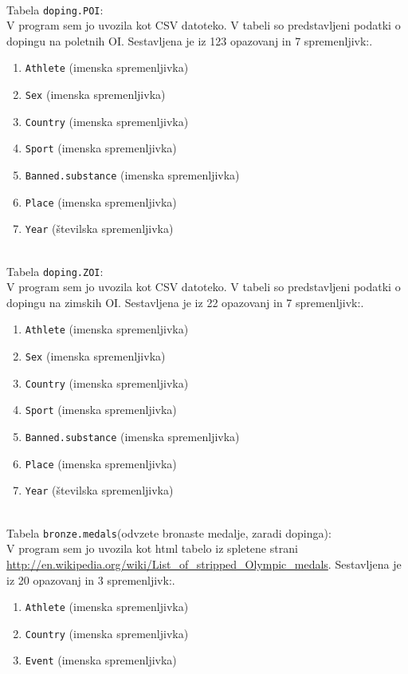 \documentclass[11pt,a4paper]{article}
\begin{document}
\newpage
\
\\
Tabela \verb|doping.POI|:
\
\\
V program sem jo uvozila kot CSV datoteko. V tabeli so predstavljeni podatki o dopingu na poletnih OI.
Sestavljena je iz 123 opazovanj in 7 spremenljivk:.
\begin{enumerate}
\item{\verb|Athlete| (imenska spremenljivka)}
\item{\verb|Sex| (imenska spremenljivka)}
\item{\verb|Country| (imenska spremenljivka)}
\item{\verb|Sport| (imenska spremenljivka)}
\item{\verb|Banned.substance| (imenska spremenljivka)}
\item{\verb|Place| (imenska spremenljivka)}
\item{\verb|Year| (številska spremenljivka)}

\end{enumerate}
\
\\
Tabela \verb|doping.ZOI|:
\
\\
V program sem jo uvozila kot CSV datoteko. V tabeli so predstavljeni podatki o dopingu na zimskih OI.
Sestavljena je iz 22 opazovanj in 7 spremenljivk:.
\begin{enumerate}
\item{\verb|Athlete| (imenska spremenljivka)}
\item{\verb|Sex| (imenska spremenljivka)}
\item{\verb|Country| (imenska spremenljivka)}
\item{\verb|Sport| (imenska spremenljivka)}
\item{\verb|Banned.substance| (imenska spremenljivka)}
\item{\verb|Place| (imenska spremenljivka)}
\item{\verb|Year| (številska spremenljivka)}

\end{enumerate}

\
\\
Tabela \verb|bronze.medals|(odvzete bronaste medalje, zaradi dopinga):
\
\\
V program sem jo uvozila kot html tabelo iz spletene strani \url{http://en.wikipedia.org/wiki/List_of_stripped_Olympic_medals}.
Sestavljena je iz 20 opazovanj in 3 spremenljivk:.
\begin{enumerate}
\item{\verb|Athlete| (imenska spremenljivka)}
\item{\verb|Country| (imenska spremenljivka)}
\item{\verb|Event| (imenska spremenljivka)}

\end{enumerate}
\end{document}
